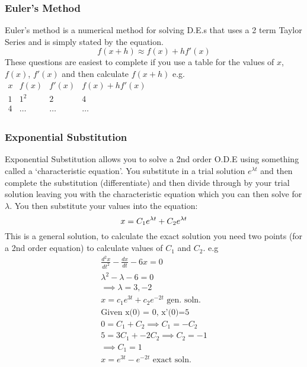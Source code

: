 \documentclass[12pt] {article}
\begin{document}
\subsubsection*{Euler's Method}
Euler's method is a numerical method for solving D.E.s that uses a 2 term Taylor Series 
and is simply stated by the equation.
\begin{equation*}
  f(x+h) \approx f(x) + hf'(x)
\end{equation*}
These questions are easiest to complete if you use a table for the values 
of $x$, $f(x)$, $f'(x)$ and then calculate $f(x+h)$ e.g.
\vspace{1em}
\newline
$\begin{array}{c|c|c|c}
  x & f(x) & f'(x) & f(x) + hf'(x) \\
  1 & 1^2 & 2 & 4 \\
  4 & \dots & \dots & \dots \\
\end{array}$

\subsubsection*{Exponential Substitution}
Exponential Substitution allows you to solve a 2nd order O.D.E using something called
a `characteristic equation'. You substitute in a trial solution $e^{\lambda t}$
and then complete the substitution (differentiate) and then divide through by your 
trial solution leaving you with the characteristic equation which you can then solve for
$\lambda$. You then substitute your values into the equation:
\begin{equation*}
  x=C_1e^{\lambda t} + C_2e^{\lambda t} \\
\end{equation*}
This is a general solution, to calculate the exact solution you need two points 
(for a 2nd order equation) to calculate values of $C_1$ and $C_2$. e.g
\begin{gather*}
  \frac{d^2x}{dt^2} - \frac{dx}{dt} -6x =0 \\
  \lambda^2 - \lambda - 6 = 0\\
  \implies \lambda=3,-2 \\
  x=c_1e^{3t} + c_2e^{-2t} \text{ gen. soln.} \\
  \text{Given x(0) = 0, x'(0)=5} \\
  0 = C_1 + C_2 \implies C_1 = -C_2 \\
  5 = 3C_1 + -2C_2 \implies C_2 = -1 \\
  \implies C_1 = 1 \\
  x=e^{3t} - e^{-2t} \text{ exact soln.} \\
\end{gather*}
\end{document}
